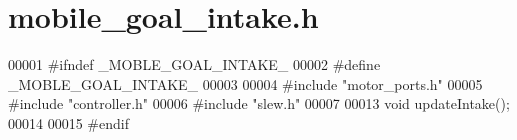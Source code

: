 \section{mobile\+\_\+goal\+\_\+intake.\+h}
\label{mobile__goal__intake_8h_source}

\begin{DoxyCode}
00001 \textcolor{preprocessor}{#ifndef \_MOBLE\_GOAL\_INTAKE\_}
00002 \textcolor{preprocessor}{#define  \_MOBLE\_GOAL\_INTAKE\_}
00003 
00004 \textcolor{preprocessor}{#include "motor_ports.h"}
00005 \textcolor{preprocessor}{#include "controller.h"}
00006 \textcolor{preprocessor}{#include "slew.h"}
00007 
00013 \textcolor{keywordtype}{void} updateIntake();
00014 
00015 \textcolor{preprocessor}{#endif}
\end{DoxyCode}
